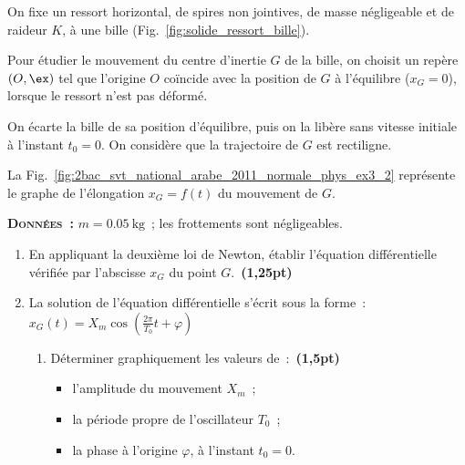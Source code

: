 \begin{minipage}{0.62\linewidth}
    On fixe un ressort horizontal, de spires non jointives, de masse négligeable
    et de raideur $K$, à une bille (Fig.~\ref{fig:solide_ressort_bille}).

    Pour étudier le mouvement du centre d'inertie $G$ de la bille, on choisit un
    repère $(O,\ex)$ tel que l'origine $O$ coïncide avec la position de $G$ à
    l'équilibre ($x_G=0$), lorsque le ressort n'est pas déformé.

    On écarte la bille de sa position d'équilibre, puis on la libère sans
    vitesse initiale à l'instant $t_0=0$. On considère que la trajectoire de $G$
    est rectiligne.

    La Fig.~\ref{fig:2bac_svt_national_arabe_2011_normale_phys_ex3_2} représente
    le graphe de l'élongation $x_G=f(t)$ du mouvement de $G$.


    \textbf{\textsc{Données~:}}
    $m=\qty{0.05}{\kg}$~; les frottements sont négligeables.

    \begin{enumerate}[series=x]
        \item En appliquant la deuxième loi de Newton, établir l'équation
              différentielle vérifiée par l'abscisse $x_G$ du point
              $G$.~\textbf{(1,25pt)}

        \item La solution de l'équation différentielle s'écrit sous la forme~:
              $x_G(t)=X_m \cos\left(\frac{2\pi}{T_0}t+\varphi\right)$

              \begin{enumerate}[series=y]
                  \item Déterminer graphiquement les valeurs
                        de~:~\textbf{(1,5pt)}
                        \begin{itemize}
                            \item l'amplitude du mouvement $X_m$~;
                            \item la période propre de l'oscillateur $T_0$~;
                            \item la phase à l'origine $\varphi$, à l'instant
                                  $t_0=0$.
                        \end{itemize}
              \end{enumerate}
    \end{enumerate}
\end{minipage}
